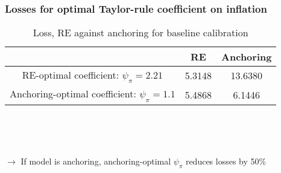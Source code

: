 \documentclass[10pt]{beamer}
\begin{document}
\begin{frame}
	\frametitle{Losses for optimal Taylor-rule coefficient on inflation}
	
\begin{center}
\begin{table}[h!]
\begin{tabular}{ c | c | c }
 & RE & Anchoring \\  \hline
 RE-optimal coefficient: $\psi_{\pi} =2.21$   &5.3148 &  13.6380 \\  \hline
 Anchoring-optimal coefficient: $\psi_{\pi} =1.1$   & 5.4868  &  6.1446 \\  \hline
\end{tabular}     
      \caption{Loss, RE against anchoring for baseline calibration}  
      \label{table_welfare}
 \end{table}
\end{center}

\

\

$\rightarrow$ If model is anchoring, anchoring-optimal $\psi_{\pi}$ reduces losses by 50\%


\end{frame}
\end{document}

